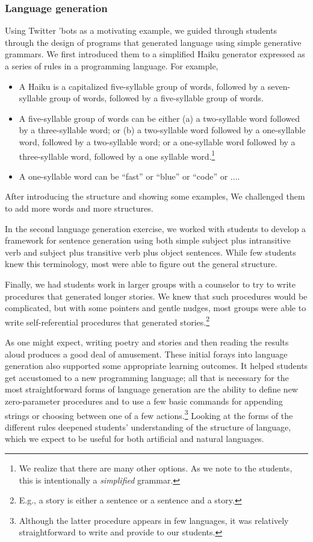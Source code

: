 \subsubsection{Language generation}

Using Twitter 'bots as a motivating example, we guided through
students through the design of programs that generated language
using simple generative grammars.  We first introduced them to a
simplified Haiku generator expressed as a series of rules in a
programming language.  For example,

\begin{itemize}
\item A Haiku is a capitalized five-syllable group of words, followed
  by a seven-syllable group of words, followed by a five-syllable
  group of words.
\item A five-syllable group of words can be either (a) a two-syllable
  word followed by a three-syllable word; or (b) a two-syllable word
  followed by a one-syllable word, followed by a two-syllable word;
  or a one-syllable word followed by a three-syllable word, followed
  by a one syllable word.\footnote{We realize that there are many
  other options.  As we note to the students, this is intentionally
  a \textit{simplified} grammar.}
\item A one-syllable word can be ``fast'' or ``blue'' or ``code'' or ....
\end{itemize}

After introducing the structure and showing some examples, We
challenged them to add more words and more structures.

In the second language generation exercise, we worked with students
to develop a framework for sentence generation using both simple
subject plus intransitive verb and subject plus transitive verb
plus object sentences.  While few students knew this terminology,
most were able to figure out the general structure.

Finally, we had students work in larger groups with a counselor to
try to write procedures that generated longer stories.    We knew
that such procedures would be complicated, but with some pointers
and gentle nudges, most groups were able to write self-referential
procedures that generated stories.\footnote{E.g., a story is either
a sentence or a sentence and a story.}

As one might expect, writing poetry and stories and then reading
the results aloud produces a good deal of amusement.  These initial
forays into language generation also supported some appropriate
learning outcomes.  It helped students get accustomed to a new
programming language; all that is necessary for the most straightforward
forms of language generation are the ability to define new zero-parameter
procedures and to use a few basic commands for appending strings
or choosing between one of a few actions.\footnote{Although the
latter procedure appears in few languages, it was relatively
straightforward to write and provide to our students.}   Looking
at the forms of the different rules deepened students' understanding
of the structure of language, which we expect to be useful for both
artificial and natural languages.

